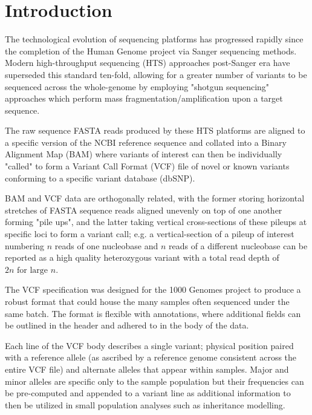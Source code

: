 
\section{Introduction}

\enlargethispage{30pt}

The technological evolution of sequencing platforms has progressed rapidly since the completion of the Human Genome project via Sanger sequencing methods. Modern high-throughput sequencing (HTS) approaches post-Sanger era have superseded this standard ten-fold, allowing for a greater number of variants to be sequenced across the whole-genome by employing "shotgun sequencing" approaches which perform mass fragmentation/amplification upon a target sequence.

The raw sequence FASTA reads produced by these HTS platforms are aligned to a specific version of the NCBI reference sequence and collated into a Binary Alignment Map (BAM) where variants of interest can then be individually "called" to form a Variant Call Format (VCF) file of novel or known variants conforming to a specific variant database (dbSNP).

BAM and VCF data are orthogonally related, with the former storing horizontal stretches of FASTA sequence reads aligned unevenly on top of one another forming "pile ups", and the latter taking vertical cross-sections of these pileups at specific loci to form a variant call; e.g.  a vertical-section of a pileup of interest numbering $n$ reads of one nucleobase and $n$ reads of a different nucleobase can be reported as a high quality heterozygous variant with a total read depth of $2n \text{ for large } n$.


The VCF specification was designed for the 1000 Genomes project to produce a robust format that could house the many samples often sequenced under the same batch. The format is flexible with annotations, where additional fields can be outlined in the header and adhered to in the body of the data. 

Each line of the VCF body describes a single variant; physical position paired with a reference allele (as ascribed by a reference genome consistent across the entire VCF file) and alternate alleles that appear within samples. Major and minor alleles are specific only to the sample population but their frequencies can be pre-computed and appended to a variant line as additional information to then be utilized in small population analyses such as inheritance modelling.


